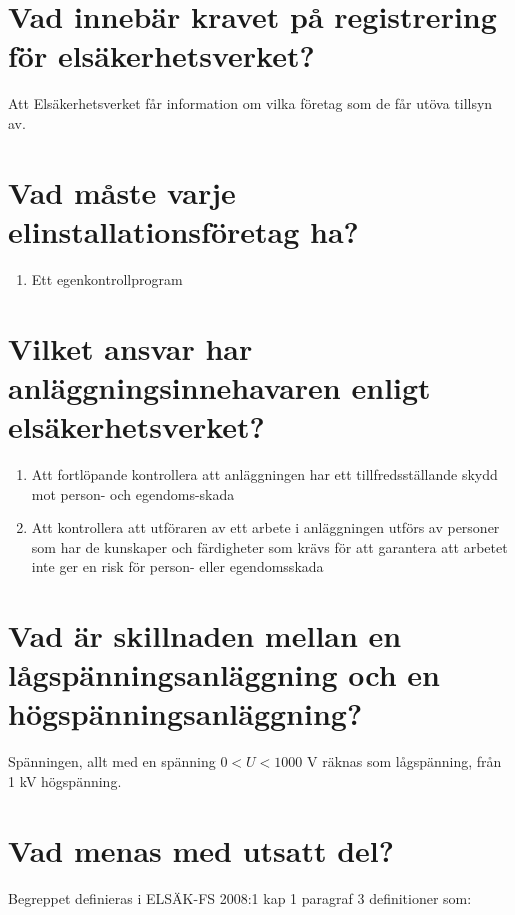 \documentclass[a4paper,swedish]{article}
\begin{document}
\setcounter{section}{51}
\section{Vad innebär kravet på registrering för elsäkerhetsverket?}

Att Elsäkerhetsverket får information om vilka företag som de får utöva tillsyn av.

\setcounter{section}{53}
\section{Vad måste varje elinstallationsföretag ha?}\label{sec:designated_person}

\begin{enumerate}
\item Ett egenkontrollprogram
\end{enumerate}

\setcounter{section}{55}
\section{Vilket ansvar har anläggningsinnehavaren enligt elsäkerhetsverket?}\label{sec:innehavarens_ansvar}

\begin{enumerate}
  \item Att fortlöpande kontrollera att anläggningen har ett tillfredsställande skydd mot person- och egendoms-skada
  \item Att kontrollera att utföraren av ett arbete i anläggningen utförs av personer som har de kunskaper och färdigheter
    som krävs för att garantera att arbetet inte ger en risk för person- eller egendomsskada
\end{enumerate}

\setcounter{section}{57}
\section{Vad är skillnaden mellan en lågspänningsanläggning och en högspänningsanläggning?}

Spänningen, allt med en spänning $0 < U <1000$ V räknas som lågspänning, från 1 kV högspänning.

\setcounter{section}{59}
\section{Vad menas med utsatt del?}

Begreppet definieras i ELSÄK-FS 2008:1 kap 1 paragraf 3 definitioner som:
\end{document}
